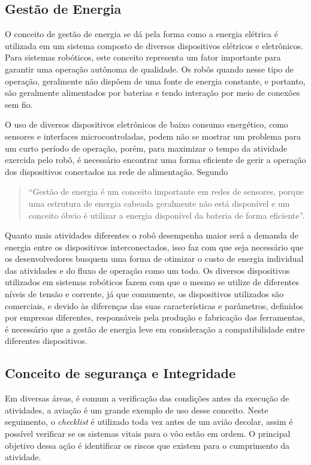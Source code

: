 \subsection{Gestão de Energia}\label{sec:gestao}
O conceito de gestão de energia se dá pela forma como a energia elétrica é utilizada em um sistema composto de diversos dispositivos elétricos e eletrônicos. Para sistemas robóticos, este conceito representa um fator importante para garantir uma operação autônoma de qualidade. Os robôs quando nesse tipo de operação, geralmente não dispõem de uma fonte de energia constante, e portanto, são geralmente alimentados por baterias e tendo interação por meio de conexões sem fio. 

O uso de diversos dispositivos eletrônicos de baixo consumo energético, como sensores e interfaces microcontroladas, podem não se mostrar um problema para um curto período de operação, porém, para maximizar o tempo da atividade exercida pelo robô, é necessário encontrar uma forma eficiente de gerir a operação dos dispositivos conectados na rede de alimentação. Segundo \cite{katiraei2006power} 
\begin{quote}
“Gestão de energia é um conceito importante em redes de sensores, porque uma estrutura de energia cabeada geralmente não está disponível e um conceito óbvio é utilizar a energia disponível da bateria de forma eficiente”. 
\end{quote}	
Quanto mais atividades diferentes o robô desempenha maior será a demanda de energia entre os dispositivos interconectados, isso faz com que seja necessário que os desenvolvedores busquem uma forma de otimizar o custo de energia individual das atividades e do fluxo de operação como um todo. Os diversos dispositivos utilizados em sistemas robóticos fazem com que o mesmo se utilize de diferentes níveis de tensão e corrente, já que comumente, os dispositivos utilizados são comerciais, e devido às diferenças das suas características e parâmetros, definidos por empresas diferentes, responsáveis pela produção e fabricação das ferramentas, é necessário que a gestão de energia leve em consideração a compatibilidade entre diferentes dispositivos.

\subsection{Conceito de segurança e Integridade}\label{sec:segur_inte}
Em diversas áreas, é comum a verificação das condições antes da execução de atividades, a aviação é um grande exemplo de uso desse conceito. Neste seguimento, o \textit{checklist} é utilizado toda vez antes de um avião decolar, assim é possível verificar se os sistemas vitais para o vôo estão em ordem. O principal objetivo dessa ação é identificar os riscos que existem para o cumprimento da atividade.

